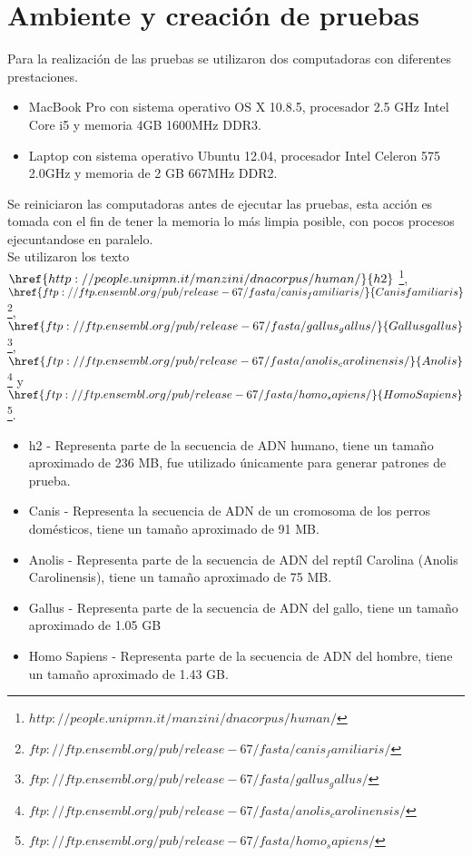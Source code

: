 \section{Ambiente y creación de pruebas}
Para la realización de las pruebas se utilizaron dos computadoras con diferentes prestaciones.
\begin{itemize}
\item MacBook Pro con sistema operativo OS X 10.8.5, procesador 2.5 GHz Intel Core i5 y memoria 4GB 1600MHz DDR3.
\item Laptop con sistema operativo Ubuntu 12.04, procesador Intel Celeron 575 2.0GHz y memoria de 2 GB 667MHz DDR2.
\end{itemize}
Se reiniciaron las computadoras antes de ejecutar las pruebas, esta acción es tomada con el fin de tener la memoria lo más limpia posible, con pocos procesos ejecuntandose en paralelo.\\
Se utilizaron los texto $\href{http://people.unipmn.it/manzini/dnacorpus/human/}{h2}$ \footnote{ $http://people.unipmn.it/manzini/dnacorpus/human/$}, $\href{ftp://ftp.ensembl.org/pub/release-67/fasta/canis_familiaris/}{Canis familiaris}$\footnote{ $ftp://ftp.ensembl.org/pub/release-67/fasta/canis_familiaris/$}, $\href{ftp://ftp.ensembl.org/pub/release-67/fasta/gallus_gallus/}{Gallus gallus}$\footnote{ $ftp://ftp.ensembl.org/pub/release-67/fasta/gallus_gallus/$}, $\href{ftp://ftp.ensembl.org/pub/release-67/fasta/anolis_carolinensis/}{Anolis}$\footnote{ $ftp://ftp.ensembl.org/pub/release-67/fasta/anolis_carolinensis/$} y $\href{ftp://ftp.ensembl.org/pub/release-67/fasta/homo_sapiens/}{Homo Sapiens}$\footnote{ $ftp://ftp.ensembl.org/pub/release-67/fasta/homo_sapiens/$}.
\begin{itemize}
\item h2 - Representa parte de la secuencia de ADN humano, tiene un tamaño aproximado de 236 MB, fue utilizado únicamente para generar patrones de prueba.
\item Canis - Representa la secuencia de ADN de un cromosoma de los perros domésticos, tiene un tamaño aproximado de 91 MB.
\item Anolis - Representa parte de la secuencia de ADN del reptíl Carolina (Anolis Carolinensis), tiene un tamaño aproximado de 75 MB.
\item Gallus - Representa parte de la secuencia de ADN del gallo, tiene un tamaño aproximado de 1.05 GB
\item Homo Sapiens - Representa parte de la secuencia de ADN del hombre, tiene un tamaño aproximado de 1.43 GB.
\end{itemize}
